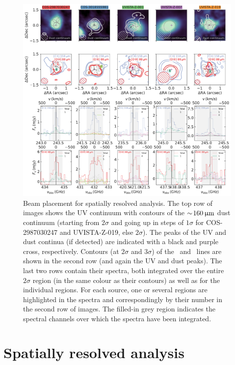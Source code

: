 \begin{figure}
    \centering
    \includegraphics[width=\linewidth]{"Plots/ChapterD/Dust_maps_spectra_clean"}
    \caption[Beam placement for spatially resolved analysis.]{Beam placement for spatially resolved analysis. The top row of images shows the UV continuum with contours of the $\sim \! 160 \, \mathrm{\upmu m}$ dust continuum (starting from $2 \sigma$ and going up in steps of $1 \sigma$ for COS-2987030247 and UVISTA-Z-019, else $2 \sigma$). The peaks of the UV and dust continua (if detected) are indicated with a black and purple cross, respectively. Contours (at $2 \sigma$ and $3 \sigma$) of the \CIILam\ and \OIIILam\ lines are shown in the second row (and again the UV and dust peaks). The last two rows contain their spectra, both integrated over the entire $2 \sigma$ region (in the same colour as their contours) as well as for the individual regions. For each source, one or several regions are highlighted in the spectra and correspondingly by their number in the second row of images. The filled-in grey region indicates the spectral channels over which the spectra have been integrated.
    }
    \label{appDfig:Beam_placement_for_spatially_resolved_analysis}
\end{figure}

\section{Spatially resolved analysis}
\label{appDsec:Spatially_resolved_analysis}

